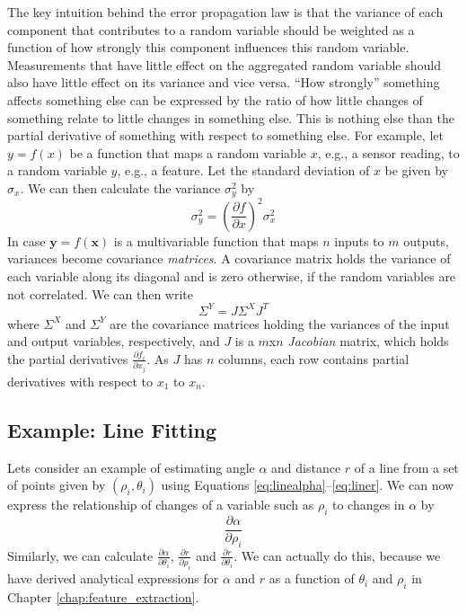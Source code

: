 The key intuition behind the error propagation law is that the variance of each component that contributes to a random variable should be weighted as a function of how strongly this component influences this random variable. Measurements that have little effect on the aggregated random variable should also have little effect on its variance and vice versa. ``How strongly'' something affects something else can be expressed by the ratio of how little changes of something relate to little changes in something else. This is nothing else than the partial derivative of something with respect to something else. For example, let $y=f(x)$ be a function that maps a random variable $x$, e.g., a sensor reading, to a random variable $y$, e.g., a feature. Let the standard deviation of $x$ be given by $\sigma_x$. We can then calculate the variance $\sigma_y^2$ by 
\begin{equation}
\sigma_y^2=\left(\frac{\partial f}{\partial x}\right)^2 \sigma_x^2
\end{equation}
In case $\mathbf{y}=f(\mathbf{x})$ is a multivariable function that maps $n$ inputs to $m$ outputs, variances become covariance \emph{matrices}. A covariance matrix holds the variance of each variable along its diagonal and is zero otherwise, if the random variables are not correlated. We can then write
\begin{equation}
\Sigma^Y= J \Sigma^X J^T
\end{equation}
where $\Sigma^X$ and $\Sigma^Y$ are the covariance matrices holding the variances of the input and output variables, respectively, and $J$ is a $m$x$n$ \emph{Jacobian} matrix, which holds the partial derivatives $\frac{\partial f_i}{\partial x_j}$. As $J$ has $n$ columns, each row contains partial derivatives with respect to $x_1$ to $x_n$.

\subsection{Example: Line Fitting}\label{sec:linefitting}
Lets consider an example of estimating angle $ \alpha$ and distance $ r$ of a line from a set of points given by $ (\rho_i,\theta_i)$ using Equations \ref{eq:linealpha}--\ref{eq:liner}. We can now express the relationship of changes of a variable such as $ \rho_i$ to changes in $ \alpha$ by
\begin{equation}
\frac{\partial \alpha}{\partial \rho_i}
\end{equation}
Similarly, we can calculate $ \frac{\partial \alpha}{\partial \theta_i}$, $ \frac{\partial r}{\partial \rho_i}$ and $ \frac{\partial r}{\partial \theta_i}$. We can actually do this, because we have derived analytical expressions for $ \alpha$ and $ r$ as a function of $ \theta_i$ and $ \rho_i$ in Chapter \ref{chap:feature_extraction}.

